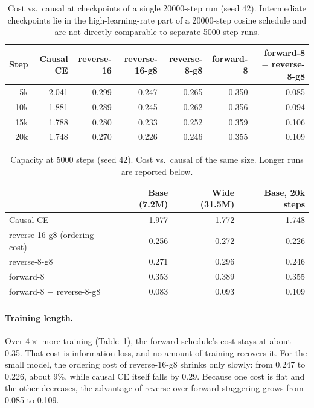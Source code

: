 \documentclass[11pt]{article}
\theoremstyle{definition}
\theoremstyle{remark}
\newcommand{\sch}[1]{\textsf{#1}}
\begin{document}
\begin{table}[t]
  \centering
  \caption{Cost vs.\ causal at checkpoints of a single 20000-step run (seed 42). Intermediate checkpoints lie in the high-learning-rate part of a 20000-step cosine schedule and are not directly comparable to separate 5000-step runs.}
  \label{tab:long}
  \small
  \begin{tabular}{rrrrrrr}
    \toprule
    Step & Causal CE & \sch{reverse-16} & \sch{reverse-16-g8} & \sch{reverse-8-g8} & \sch{forward-8} & \sch{forward-8} $-$ \sch{reverse-8-g8} \\
    \midrule
    5k  & 2.041 & 0.299 & 0.247 & 0.265 & 0.350 & 0.085 \\
    10k & 1.881 & 0.289 & 0.245 & 0.262 & 0.356 & 0.094 \\
    15k & 1.788 & 0.280 & 0.233 & 0.252 & 0.359 & 0.106 \\
    20k & 1.748 & 0.270 & 0.226 & 0.246 & 0.355 & 0.109 \\
    \bottomrule
  \end{tabular}
\end{table}

\begin{table}[t]
  \centering
  \caption{Capacity at 5000 steps (seed 42). Cost vs.\ causal of the same size. Longer runs are reported below.}
  \label{tab:wide}
  \small
  \begin{tabular}{lrrr}
    \toprule
     & Base (7.2M) & Wide (31.5M) & Base, 20k steps \\
    \midrule
    Causal CE                          & 1.977 & 1.772 & 1.748 \\
    \sch{reverse-16-g8} (ordering cost) & 0.256 & 0.272 & 0.226 \\
    \sch{reverse-8-g8}                  & 0.271 & 0.296 & 0.246 \\
    \sch{forward-8}                     & 0.353 & 0.389 & 0.355 \\
    \sch{forward-8} $-$ \sch{reverse-8-g8} & 0.083 & 0.093 & 0.109 \\
    \bottomrule
  \end{tabular}
\end{table}

\paragraph{Training length.}
Over $4\times$ more training (Table~\ref{tab:long}), the forward schedule's cost stays at about 0.35.
That cost is information loss, and no amount of training recovers it.
For the small model, the ordering cost of \sch{reverse-16-g8} shrinks only slowly: from 0.247 to 0.226, about 9\%, while causal CE itself falls by 0.29.
Because one cost is flat and the other decreases, the advantage of reverse over forward staggering grows from 0.085 to 0.109.
\end{document}
